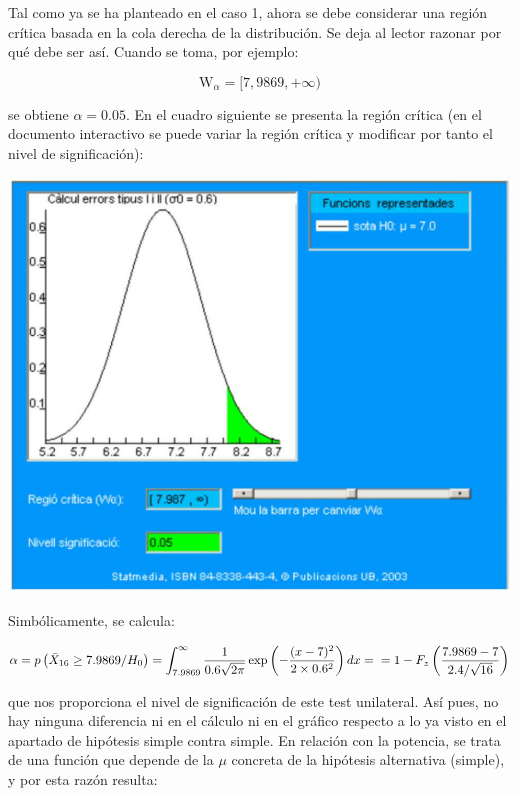\documentclass[
]{article}
\begin{document}
Tal como ya se ha planteado en el caso 1, ahora se debe considerar una región crítica basada en la cola derecha de la distribución. Se deja al lector razonar por qué debe ser así. Cuando se toma, por ejemplo:

\[
\mathrm{W}_{\alpha}=[7,9869,+\infty)
\]

se obtiene \(\alpha=0.05\). En el cuadro siguiente se presenta la región crítica (en el documento interactivo se puede variar la región crítica y modificar por tanto el nivel de significación):

\begin{center}\includegraphics[width=0.9\linewidth]{images/cap9-RCHipotesisComposta2} \end{center}

Simbólicamente, se calcula:

\[
\alpha=p\left(\bar{X}_{16} \geq 7.9869 / H_{0}\right)=\int_{7.9869}^{\infty} \frac{1}{0.6 \sqrt{2 \pi}} \exp \left(-\frac{(x-7)^{2}}{2 \times 0.6^{2}}\right) d x=\\ = 1-F_{z}\left(\frac{7.9869-7}{2.4 / \sqrt{16}}\right)
\]

que nos proporciona el nivel de significación de este test unilateral. Así pues, no hay ninguna diferencia ni en el cálculo ni en el gráfico respecto a lo ya visto en el apartado de hipótesis simple contra simple. En relación con la potencia, se trata de una función que depende de la \(\mu\) concreta de la hipótesis alternativa (simple), y por esta razón resulta:
\end{document}
